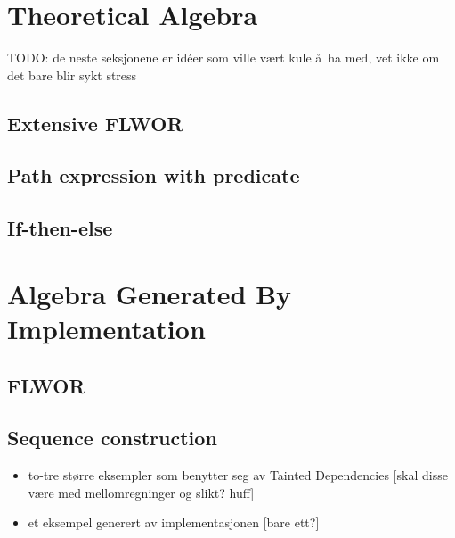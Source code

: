 \section{Theoretical Algebra}
TODO: de neste seksjonene er idéer som ville v\ae rt kule \aa~ha med, vet ikke
om det bare blir sykt stress
\subsection{Extensive FLWOR}
\subsection{Path expression with predicate}
\subsection{If-then-else}

\section{Algebra Generated By Implementation}
\subsection{FLWOR}
\subsection{Sequence construction}

\begin{itemize}
  \item to-tre større eksempler som benytter seg av Tainted Dependencies [skal
  disse v\ae re med mellomregninger og slikt? huff]
  \item et eksempel generert av implementasjonen [bare ett?]
\end{itemize}